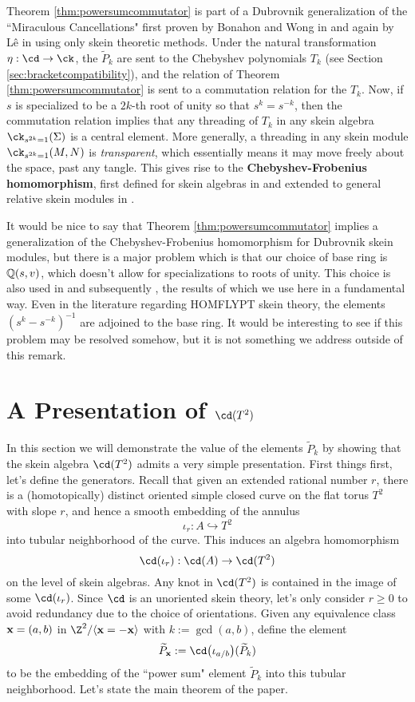 \begin{remark}
Theorem \ref{thm:powersumcommutator} is part of a Dubrovnik generalization of the ``Miraculous Cancellations" first proven by Bonahon and Wong in \cite{BW16} and again by Lê in \cite{Le15} using only skein theoretic methods. Under the natural transformation $\eta:\cd \to \ck$, the $\widetilde{P}_k$ are sent to the Chebyshev polynomials $T_k$ (see Section \ref{sec:bracketcompatibility}), and the relation of Theorem \ref{thm:powersumcommutator} is sent to a commutation relation for the $T_k$. Now, if $s$ is specialized to be a $2k$-th root of unity so that $s^k = s^{-k}$, then the commutation relation implies that any threading of $T_k$ in any skein algebra $\ck_{s^{2k}=1}(\Sigma)$ is a central element. More generally, a threading in any skein module $\ck_{s^{2k}=1}(M, N)$ is \textit{transparent}, which essentially means it may move freely about the space, past any tangle. This gives rise to the \textbf{Chebyshev-Frobenius homomorphism}, first defined for skein algebras in \cite{BW16} and extended to general relative skein modules in \cite{LP19}.

It would be nice to say that Theorem \ref{thm:powersumcommutator} implies a generalization of the Chebyshev-Frobenius homomorphism for Dubrovnik skein modules, but there is a major problem which is that our choice of base ring is $\mathbb{Q}(s,v)$, which doesn't allow for specializations to roots of unity. This choice is also used in \cite{BB01} and subsequently \cite{LZ02}, the results of which we use here in a fundamental way. Even in the literature regarding HOMFLYPT skein theory, the elements $(s^k - s^{-k})^{-1}$ are adjoined to the base ring. It would be interesting to see if this problem may be resolved somehow, but it is not something we address outside of this remark. 
\end{remark}


\section{A Presentation of $\cd(T^2)$} \label{sec:presentation}

In this section we will demonstrate the value of the elements $\widetilde{P}_k$  by showing that the skein algebra $\cd(T^2)$ admits a very simple presentation. First things first, let's define the generators. Recall that given an extended rational number $r$, there is a (homotopically) distinct oriented simple closed curve on the flat torus $T^2$ with slope $r$, and hence a smooth embedding of the annulus 
\[
\iota_r: A \hookrightarrow T^2
\]
into tubular neighborhood of the curve. This induces an algebra homomorphism
\[
\cd(\iota_r): \cd(A) \to \cd(T^2)
\]
on the level of skein algebras. Any knot in $\cd(T^2)$ is contained in the image of some $\cd(\iota_r)$. Since $\cd$ is an unoriented skein theory, let's only consider $r \geq 0$ to avoid redundancy due to the choice of orientations. Given any equivalence class ${\mathbf{x}} = (a, b)$ in $\Z^2 / \langle \xx = - \xx \rangle$ with $k := \gcd(a, b)$, define the element
\[
\widetilde{P}_\xx := \cd\big(\iota_{a/b}\big)(\widetilde{P}_k)
\]
to be the embedding of the ``power sum" element $\widetilde{P}_k$ into this tubular neighborhood. Let's state the main theorem of the paper.

